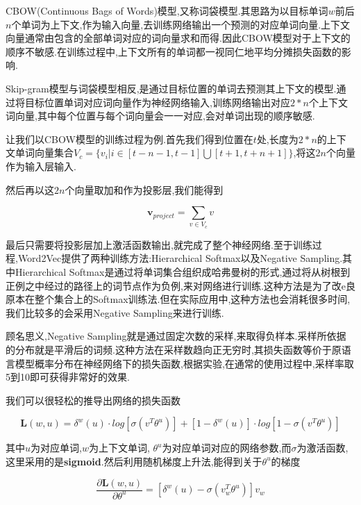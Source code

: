 CBOW(Continuous Bags of Words)模型,又称词袋模型.其思路为以目标单词$w$前后$n$个单词为上下文,作为输入向量,去训练网络输出一个预测的对应单词向量.上下文向量通常由包含的全部单词对应的词向量求和而得.因此CBOW模型对于上下文的顺序不敏感.在训练过程中,上下文所有的单词都一视同仁地平均分摊损失函数的影响.

Skip-gram模型与词袋模型相反,是通过目标位置的单词去预测其上下文的模型.通过将目标位置单词对应词向量作为神经网络输入,训练网络输出对应$2*n$个上下文词向量,其中每个位置与每个词向量会一一对应,会对单词出现的顺序敏感.

让我们以CBOW模型的训练过程为例.首先我们得到位置在$t$处,长度为$2*n$的上下文单词向量集合$V_c = \{v_i|i \in [t-n-1, t-1] \bigcup [t+1, t+n+1]\}$,将这$2n$个向量作为输入层输入.

然后再以这$2n$个向量取加和作为投影层,我们能得到

\begin{equation}
	\mathbf{v}_{project} = \sum_{v \in V_c} v
\end{equation}

最后只需要将投影层加上激活函数输出,就完成了整个神经网络.至于训练过程,Word2Vec提供了两种训练方法:Hierarchical Softmax以及Negative Sampling.其中Hierarchical Softmax是通过将单词集合组织成哈弗曼树的形式,通过将从树根到正例之中经过的路径上的词节点作为负例,来对网络进行训练.这种方法是为了改e良原本在整个集合上的Softmax训练法.但在实际应用中,这种方法也会消耗很多时间,我们比较多的会采用Negative Sampling来进行训练.

顾名思义,Negative Sampling就是通过固定次数的采样,来取得负样本.采样所依据的分布就是平滑后的词频.这种方法在采样数趋向正无穷时,其损失函数等价于原语言模型概率分布在神经网络下的损失函数\cite{gutmann2010noise},根据实验,在通常的使用过程中,采样率取5到10即可获得非常好的效果.

我们可以很轻松的推导出网络的损失函数

\begin{equation}
	\mathbf{L}(w,u) = \delta^{w}(u) \cdot log[\sigma(v^{T}\theta^{u})] + [1-\delta^{w}(u)] \cdot log[1-\sigma(v^{T}\theta^{u})]
\end{equation}

其中$u$为对应单词,$w$为上下文单词, $\theta^{u}$为对应单词对应的网络参数,而$\sigma$为激活函数,这里采用的是\textbf{sigmoid}.然后利用随机梯度上升法,能得到关于$\theta^{u}$的梯度

\begin{equation}
	\frac{\partial \mathbf{L}(w,u)}{\partial \theta^{u}} = [\delta^{w}(u)-\sigma(v_w^{T}\theta^{u})]v_w
\end{equation}

